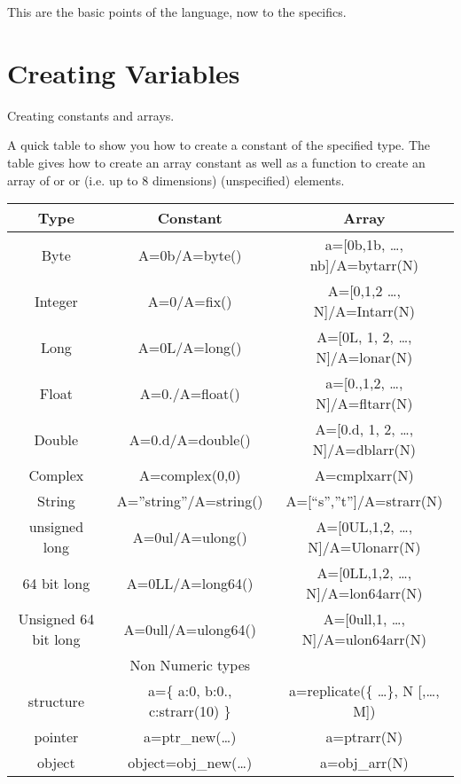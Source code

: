   This are the basic points of the language, now to the specifics.

\section{Creating Variables}\label{sec:qs-creating-variables}

    Creating constants and arrays.
   
    A quick table to show you how to create a constant of the
    specified type. The table gives how to create an array constant as
    well as a function to create an array of  or  or
     (i.e. up to 8 dimensions) (unspecified)
    elements.

  
    \begin{center}
     \begin{tabular}{||c|c|c||}\hline\hline\label{tab:variables}
        Type & Constant & Array\\\hline\hline
        Byte    & A=0b/A=byte() & a=[0b,1b, \ldots , nb]/A=bytarr(N)\\
        Integer & A=0/A=fix() & A=[0,1,2 \ldots , N]/A=Intarr(N)\\
        Long    & A=0L/A=long() & A=[0L, 1, 2, \ldots, N]/A=lonar(N)  \\
        Float   & A=0./A=float() & a=[0.,1,2, \ldots, N]/A=fltarr(N) \\
        Double  & A=0.d/A=double() & A=[0.d, 1, 2, \ldots, N]/A=dblarr(N)\\
        Complex & A=complex(0,0) & A=cmplxarr(N) \\
        String  & A=''string''/A=string() & A=[``s'',''t'']/A=strarr(N)\\
        unsigned long   & A=0ul/A=ulong() & A=[0UL,1,2, \ldots, N]/A=Ulonarr(N)\\
        64 bit long & A=0LL/A=long64() & A=[0LL,1,2, \ldots, N]/A=lon64arr(N)\\
        Unsigned 64 bit long & A=0ull/A=ulong64() & A=[0ull,1, \ldots, N]/A=ulon64arr(N)\\\hline\hline 
                  & Non Numeric types  &\\\hline\hline
        structure & a=\{ a:0, b:0., c:strarr(10) \} & a=replicate(\{ \ldots \}, N [,\ldots, M]) \\
        pointer & a=ptr\_new(\ldots) & a=ptrarr(N)\\
        object & object=obj\_new(\ldots) & a=obj\_arr(N)\\\hline
    \end{tabular}
    \end{center}     

